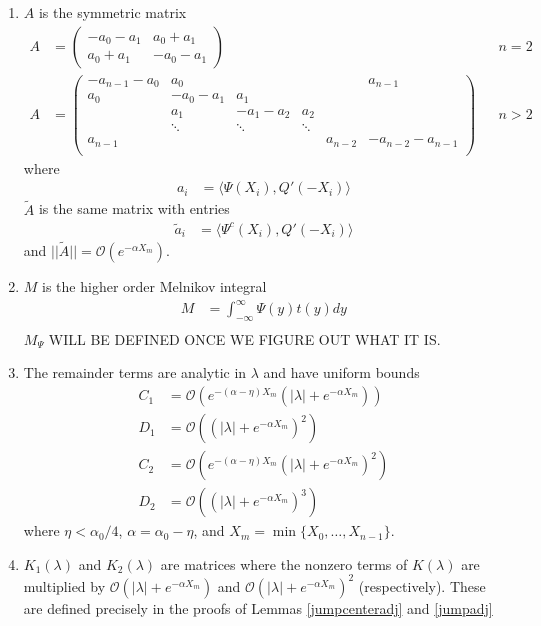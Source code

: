 \documentclass[thesis.tex]{subfiles}
\begin{document}
\begin{theorem}
\begin{enumerate}
\item $A$ is the symmetric matrix
\begin{align}\label{Asymm}
A &= \begin{pmatrix}
-a_0 -a_1 & a_0 + a_1 \\
a_0 + a_1 & -a_0 - a_1
\end{pmatrix} && n = 2 \\
A &= \begin{pmatrix}
-a_{n-1} - a_0 & a_0 & & &  & a_{n-1}\\
a_0 & -a_0 - a_1 &  a_1 \\
& a_1 & -a_1 - a_2 &  a_2 \\
& \ddots & \ddots & \ddots \\
a_{n-1} & & & & a_{n-2} & -a_{n-2} - a_{n-1} \\
\end{pmatrix} && n > 2 \nonumber
\end{align}
where
\begin{align*}
a_i &= \langle \Psi(X_i), Q'(-X_i) \rangle
\end{align*}
$\tilde{A}$ is the same matrix with entries
\begin{align*}
\tilde{a}_i &= \langle \Psi^c(X_i), Q'(-X_i) \rangle
\end{align*}
and $||\tilde{A}|| = \mathcal{O}(e^{-\alpha X_m})$.

\item $M$ is the higher order Melnikov integral
\begin{align*}
M &= \int_{-\infty}^\infty \Psi(y) t(y) dy \\
\end{align*}
$M_\Psi$ WILL BE DEFINED ONCE WE FIGURE OUT WHAT IT IS.

\item The remainder terms are analytic in $\lambda$ and have uniform bounds
\begin{align*}
C_1 &= \mathcal{O}(e^{-(\alpha - \eta) X_m}(|\lambda| + e^{-\alpha X_m})) \\
D_1 &= \mathcal{O}((|\lambda| + e^{-\alpha X_m})^2) \\
C_2 &= \mathcal{O}(e^{-(\alpha - \eta) X_m}(|\lambda| + e^{-\alpha X_m})^2) \\
D_2 &= \mathcal{O}((|\lambda| + e^{-\alpha X_m})^3)
\end{align*}
where $\eta < \alpha_0/4$, $\alpha = \alpha_0 - \eta$, and $X_m = \min\{X_0, \dots, X_{n-1}\}$.

\item $K_1(\lambda)$ and $K_2(\lambda)$ are matrices where the nonzero terms of $K(\lambda)$ are multiplied by $\mathcal{O}(|\lambda| + e^{-\alpha X_m})$ and $\mathcal{O}(|\lambda| + e^{-\alpha X_m})^2$ (respectively). These are defined precisely in the proofs of Lemmas \ref{jumpcenteradj} and \ref{jumpadj}

\end{enumerate}
\end{theorem}
\end{document}
